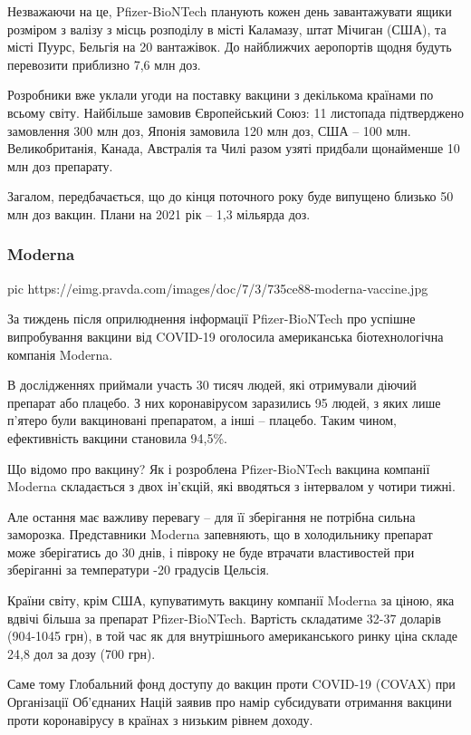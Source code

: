 Незважаючи на це, Pfizer-BioNTech планують кожен день завантажувати ящики
розміром з валізу з місць розподілу в місті Каламазу, штат Мічиган (США), та
місті Пуурс, Бельгія на 20 вантажівок. До найближчих аеропортів щодня будуть
перевозити приблизно 7,6 млн доз.

Розробники вже уклали угоди на поставку вакцини з декількома країнами по всьому
світу. Найбільше замовив Європейський Союз: 11 листопада підтверджено
замовлення 300 млн доз, Японія замовила 120 млн доз, США – 100 млн.
Великобританія, Канада, Австралія та Чилі разом узяті придбали щонайменше 10
млн доз препарату.

Загалом, передбачається, що до кінця поточного року буде випущено близько
50 млн доз вакцин. Плани на 2021 рік – 1,3 мільярда доз.

\subsubsection{Moderna}

\ifcmt
pic https://eimg.pravda.com/images/doc/7/3/735ce88-moderna-vaccine.jpg
\fi

За тиждень після оприлюднення інформації Pfizer-BioNTech про успішне
випробування вакцини від COVID-19 оголосила американська біотехнологічна
компанія Moderna.

В дослідженнях приймали участь 30 тисяч людей, які отримували діючий препарат
або плацебо. З них коронавірусом заразились 95 людей, з яких лише п'ятеро були
вакциновані препаратом, а інші – плацебо. Таким чином, ефективність вакцини
становила 94,5\%.

Що відомо про вакцину? Як і розроблена Pfizer-BioNTech вакцина компанії Moderna
складається з двох ін’єкцій, які вводяться з інтервалом у чотири тижні.

Але остання має важливу перевагу – для її зберігання не потрібна сильна
заморозка. Представники Moderna запевняють, що в холодильнику препарат може
зберігатись до 30 днів, і півроку не буде втрачати властивостей при зберіганні
за температури -20 градусів Цельсія.

Країни світу, крім США, купуватимуть вакцину компанії Moderna за ціною, яка
вдвічі більша за препарат Pfizer-BioNTech. Вартість складатиме 32-37 доларів
(904-1045 грн), в той час як для внутрішнього американського ринку ціна складе
24,8 дол за дозу (700 грн).

Саме тому Глобальний фонд доступу до вакцин проти COVID-19 (COVAX) при
Організації Об'єднаних Націй заявив про намір субсидувати отримання вакцини
проти коронавірусу в країнах з низьким рівнем доходу.

